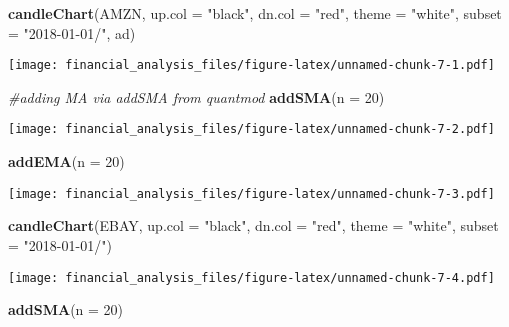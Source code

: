 \documentclass[]{article}
\newenvironment{Shaded}{\begin{snugshade}}{\end{snugshade}}
\newcommand{\KeywordTok}[1]{\textcolor[rgb]{0.13,0.29,0.53}{\textbf{#1}}}
\newcommand{\DataTypeTok}[1]{\textcolor[rgb]{0.13,0.29,0.53}{#1}}
\newcommand{\DecValTok}[1]{\textcolor[rgb]{0.00,0.00,0.81}{#1}}
\newcommand{\StringTok}[1]{\textcolor[rgb]{0.31,0.60,0.02}{#1}}
\newcommand{\CommentTok}[1]{\textcolor[rgb]{0.56,0.35,0.01}{\textit{#1}}}
\newcommand{\NormalTok}[1]{#1}
\begin{document}
\begin{Shaded}
\begin{Highlighting}[]
\KeywordTok{candleChart}\NormalTok{(AMZN, }\DataTypeTok{up.col =} \StringTok{"black"}\NormalTok{, }\DataTypeTok{dn.col =} \StringTok{"red"}\NormalTok{, }\DataTypeTok{theme =} \StringTok{"white"}\NormalTok{, }\DataTypeTok{subset =} \StringTok{"2018-01-01/"}\NormalTok{, ad)}
\end{Highlighting}
\end{Shaded}

\texttt{[image: financial\_analysis\_files/figure-latex/unnamed-chunk-7-1.pdf]}

\begin{Shaded}
\begin{Highlighting}[]
\CommentTok{#adding MA via addSMA from quantmod}
\KeywordTok{addSMA}\NormalTok{(}\DataTypeTok{n =} \DecValTok{20}\NormalTok{)}
\end{Highlighting}
\end{Shaded}

\texttt{[image: financial\_analysis\_files/figure-latex/unnamed-chunk-7-2.pdf]}

\begin{Shaded}
\begin{Highlighting}[]
\KeywordTok{addEMA}\NormalTok{(}\DataTypeTok{n =} \DecValTok{20}\NormalTok{)}
\end{Highlighting}
\end{Shaded}

\texttt{[image: financial\_analysis\_files/figure-latex/unnamed-chunk-7-3.pdf]}

\begin{Shaded}
\begin{Highlighting}[]
\KeywordTok{candleChart}\NormalTok{(EBAY, }\DataTypeTok{up.col =} \StringTok{"black"}\NormalTok{, }\DataTypeTok{dn.col =} \StringTok{"red"}\NormalTok{, }\DataTypeTok{theme =} \StringTok{"white"}\NormalTok{, }\DataTypeTok{subset =} \StringTok{"2018-01-01/"}\NormalTok{)}
\end{Highlighting}
\end{Shaded}

\texttt{[image: financial\_analysis\_files/figure-latex/unnamed-chunk-7-4.pdf]}

\begin{Shaded}
\begin{Highlighting}[]
\KeywordTok{addSMA}\NormalTok{(}\DataTypeTok{n =} \DecValTok{20}\NormalTok{)}
\end{Highlighting}
\end{Shaded}
\end{document}
